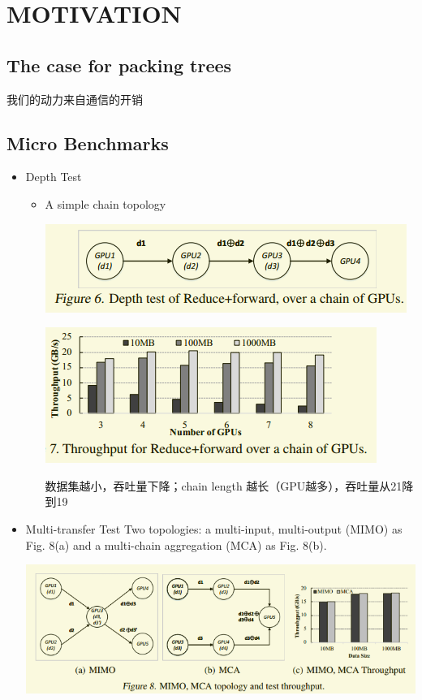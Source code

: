 \documentclass[11pt]{article}
\begin{document}
\section{MOTIVATION}
\label{sec:org56b6d50}
\subsection{The case for packing trees}
\label{sec:org4b49f4c}
我们的动力来自通信的开销
\subsection{Micro Benchmarks}
\label{sec:org2f0ad64}
\begin{itemize}
\item Depth Test
\begin{itemize}
\item A simple chain topology
\begin{center}
\includegraphics[width=.9\linewidth]{Blink.org_imgs/20201111_192652_Ssn2iX.png}
\end{center}

\begin{center}
\includegraphics[width=.9\linewidth]{Blink.org_imgs/20201111_192714_5JMvwz.png}
\end{center}
数据集越小，吞吐量下降；chain length 越长（GPU越多），吞吐量从21降到19
\end{itemize}

\item Multi-transfer Test
Two topologies: a multi-input, multi-output (MIMO) as Fig. 8(a) and a multi-chain aggregation (MCA) as Fig. 8(b).
\begin{center}
\includegraphics[width=.9\linewidth]{Blink.org_imgs/20201111_193156_SWDr8u.png}
\end{center}
\end{itemize}
\end{document}
